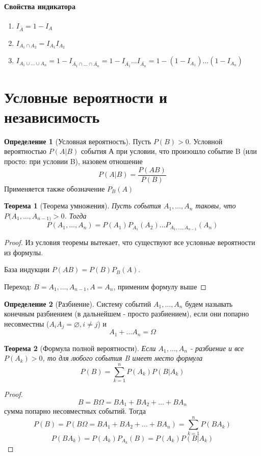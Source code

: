 \documentclass[a4paper]{article}
\newtheorem{theorem}{Теорема}[section]
\theoremstyle{definition}
\newtheorem*{definition}{Определение}
\theoremstyle{remark}
\begin{document}
\paragraph{Свойства индикатора}
\begin{enumerate}
    \item $I_{\bar{A}} = 1 - I_A$
    \item $I_{A_1 \cap A_2} = I_{A_1}I_{A_2}$
    \item $I_{A_1\cup\dots\cup A_n} = 1 - I_{\bar{A_1} \cap \dots\cap \bar{A_n}} = 1  -  I_{\bar{A_1}}\dots I_{\bar{A_n}} = 1 - (1 - I_{A_1})\dots(1 - I_{A_n})$
\end{enumerate}
\section{Условные вероятности и независимость}
\begin{definition}[Условная вероятность]
    Пусть $P(B)>0$. Условной вероятностью $P(A|B)$ события А при условии, что произошло событие B (или просто: при условии B), назовем отношение
    $$P(A|B) = \frac{P(AB)}{P(B)}$$
    Применяется также обозначение $P_B(A)$
\end{definition}
\begin{theorem}[Теорема умножения]
    Пусть события $A_1, \dots, A_n$ таковы, что $P(A_1, \dots, A_{n-1)}>0$. Тогда $$P(A_1, \dots, A_n) = P(A_1)P_{A_1}(A_2)\dots P_{A_1, \dots, A_{n-1}}(A_n)$$
\end{theorem}
\begin{proof}
    Из условия теоремы вытекает, что существуют все условные вероятности из формулы.
    
    База индукции $P(AB) = P(B)P_B(A)$.

    Переход: $B=A_1, \dots, A_{n-1}, A = A_n$, применим формулу выше
\end{proof}
\begin{definition}[Разбиение]
    Систему событий $A_1, \dots, A_n$ будем называть конечным разбиением (в дальнейшем - просто разбиением),
    если они попарно несовместны ($A_i A_j = \varnothing, i\neq j$) и 
    \[A_1+\dots A_n = \Omega\]
\end{definition}
\begin{theorem}[Формула полной вероятности]
    Если $A_1, \dots, A_n$ - разбиение и все $P(A_k)>0$, то для любого события B имеет
    место формула
    \[P(B) = \sum_{k = 1}^n P(A_k)P(B|A_k)\]
\end{theorem}
\begin{proof}
    \[B = B\Omega = B A_1 + B A_2 + \dots + B A_n\]
    сумма попарно несовместных событий. Тогда
    \[P(B) = P(B\Omega = B A_1 + B A_2 + \dots + B A_n) = \sum_{k = 1}^{n} P (B A_k)\]
    \[P(B A_k) = P(A_k) P_{A_k}(B) = P(A_k) P(B|A_k)\]
\end{proof}
\end{document}
